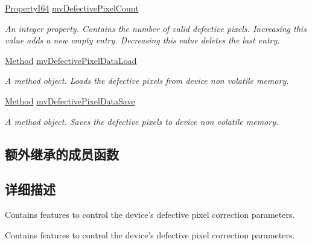\begin{DoxyCompactItemize}
\hyperlink{group___common_interface_ga81749b2696755513663492664a18a893}{Property\+I64} \hyperlink{classmv_i_m_p_a_c_t_1_1acquire_1_1_gen_i_cam_1_1mv_defective_pixel_correction_control_a4f7d37dd9b5ecd6469ab5f847929d1cf}{mv\+Defective\+Pixel\+Count}
\begin{DoxyCompactList}\small\item\em An integer property. Contains the number of valid defective pixels. Increasing this value adds a new empty entry. Decreasing this value deletes the last entry. \end{DoxyCompactList}\item 
\hyperlink{classmv_i_m_p_a_c_t_1_1acquire_1_1_method}{Method} \hyperlink{classmv_i_m_p_a_c_t_1_1acquire_1_1_gen_i_cam_1_1mv_defective_pixel_correction_control_ade84f64ea63b2949dfdaaf618dd295af}{mv\+Defective\+Pixel\+Data\+Load}
\begin{DoxyCompactList}\small\item\em A method object. Loads the defective pixels from device non volatile memory. \end{DoxyCompactList}\item 
\hyperlink{classmv_i_m_p_a_c_t_1_1acquire_1_1_method}{Method} \hyperlink{classmv_i_m_p_a_c_t_1_1acquire_1_1_gen_i_cam_1_1mv_defective_pixel_correction_control_a4acdf44b93d160f06022d1e52f5b1e42}{mv\+Defective\+Pixel\+Data\+Save}
\begin{DoxyCompactList}\small\item\em A method object. Saves the defective pixels to device non volatile memory. \end{DoxyCompactList}\end{DoxyCompactItemize}
\subsection*{额外继承的成员函数}


\subsection{详细描述}
Contains features to control the device's defective pixel correction parameters. 

Contains features to control the device's defective pixel correction parameters. 

